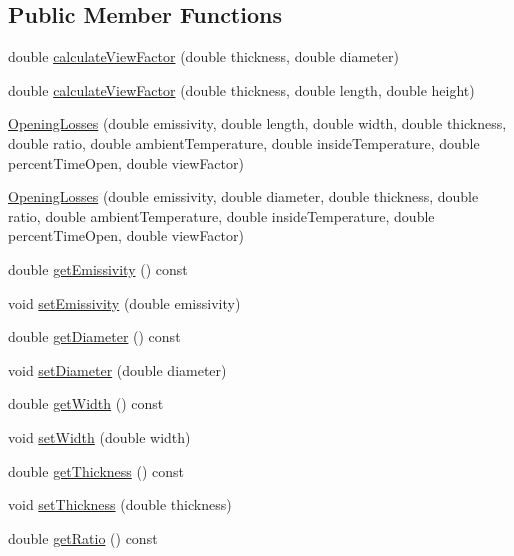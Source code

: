 \subsection*{Public Member Functions}
\begin{DoxyCompactItemize}
\item 
double \hyperlink{class_opening_losses_aa8ffc249e49ee7f8413f32f7e803524a}{calculate\+View\+Factor} (double thickness, double diameter)
\item 
double \hyperlink{class_opening_losses_abef4b1d97525d3cdab0bc5587ab12f91}{calculate\+View\+Factor} (double thickness, double length, double height)
\item 
\hyperlink{class_opening_losses_a74205733c9a9b328bd9bf15c73841a8f}{Opening\+Losses} (double emissivity, double length, double width, double thickness, double ratio, double ambient\+Temperature, double inside\+Temperature, double percent\+Time\+Open, double view\+Factor)
\item 
\hyperlink{class_opening_losses_af5406c6281fda46406456cdaa9d948fa}{Opening\+Losses} (double emissivity, double diameter, double thickness, double ratio, double ambient\+Temperature, double inside\+Temperature, double percent\+Time\+Open, double view\+Factor)
\item 
double \hyperlink{class_opening_losses_a7eaf8e68f268e8ff1671c5f9f0462b4f}{get\+Emissivity} () const
\item 
void \hyperlink{class_opening_losses_aa63eb1c2ba9057d401f3a7f5dd974afe}{set\+Emissivity} (double emissivity)
\item 
double \hyperlink{class_opening_losses_a8ed643300b0f5b606be6cd669cd413c3}{get\+Diameter} () const
\item 
void \hyperlink{class_opening_losses_ab840ba51788e83c0b1dc9b8c05b1eadb}{set\+Diameter} (double diameter)
\item 
double \hyperlink{class_opening_losses_a0374aeac5532188358b5f6ad0f120305}{get\+Width} () const
\item 
void \hyperlink{class_opening_losses_a5ee8c514917c16ecd2c63caecc98e1c6}{set\+Width} (double width)
\item 
double \hyperlink{class_opening_losses_aeefdf4431056de65ca84c6dfb24b61e1}{get\+Thickness} () const
\item 
void \hyperlink{class_opening_losses_a221cc88072e4f0975f15c6cd96781dea}{set\+Thickness} (double thickness)
\item 
double \hyperlink{class_opening_losses_ac9f7dbd2cc023932b5d8076a21a3f690}{get\+Ratio} () const
\item 

\end{DoxyCompactItemize}
